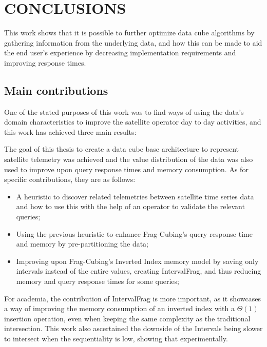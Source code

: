 
\chapter{CONCLUSIONS}\label{ch:concl}

This work shows that it is possible to further optimize data cube algorithms by gathering information from the underlying data, and how this can be made to aid the end user's experience by decreasing implementation requirements and improving response times.

\section{Main contributions}\label{ch:concl:contrib}

One of the stated purposes of this work was to find ways of using the data's domain characteristics to improve the satellite operator day to day activities, and this work has achieved three main results:

The goal of this thesis to create a data cube base architecture to represent satellite telemetry was achieved and the value distribution of the data was also used to improve upon query response times and memory consumption.
As for specific contributions, they are as follows:

\begin{itemize}[noitemsep]
\item A heuristic to discover related telemetries between satellite time series data and how to use this with the help of an operator to validate the relevant queries;
\item Using the previous heuristic to enhance Frag-Cubing's query response time and memory by pre-partitioning the data;
\item Improving upon Frag-Cubing's Inverted Index memory model by saving only intervals instead of the entire values, creating IntervalFrag, and thus reducing memory and query response times for some queries;
\end{itemize}

For academia, the contribution of IntervalFrag is more important, as it showcases a way of improving the memory consumption of an inverted index with a $\Theta(1)$ insertion operation, even when keeping the same complexity as the traditional intersection.
This work also ascertained the downside of the Intervals being slower to intersect when the sequentiality is low, showing that experimentally.

